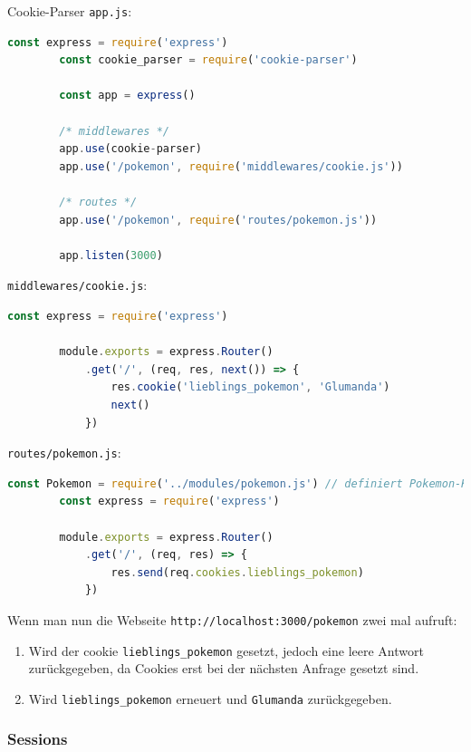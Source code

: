 \begin{example}{Cookie-Parser}
    \texttt{app.js}:
    \begin{lstlisting}[language=JavaScript]
        const express = require('express')
        const cookie_parser = require('cookie-parser')

        const app = express()

        /* middlewares */
        app.use(cookie-parser)
        app.use('/pokemon', require('middlewares/cookie.js'))
        
        /* routes */
        app.use('/pokemon', require('routes/pokemon.js'))

        app.listen(3000)
    \end{lstlisting}

    \texttt{middlewares/cookie.js}:
    \begin{lstlisting}[language=JavaScript]
        const express = require('express')
        
        module.exports = express.Router()
            .get('/', (req, res, next()) => {
                res.cookie('lieblings_pokemon', 'Glumanda')
                next()
            })
    \end{lstlisting}

    \texttt{routes/pokemon.js}:
    \begin{lstlisting}[language=JavaScript]
        const Pokemon = require('../modules/pokemon.js') // definiert Pokemon-Klasse
        const express = require('express')
        
        module.exports = express.Router()
            .get('/', (req, res) => {
                res.send(req.cookies.lieblings_pokemon)
            })
    \end{lstlisting}

    Wenn man nun die Webseite \texttt{http://localhost:3000/pokemon} zwei mal aufruft:
    \begin{enumerate}
        \item Wird der cookie \texttt{lieblings\_pokemon} gesetzt, jedoch eine leere Antwort zurückgegeben, da Cookies erst bei der nächsten Anfrage gesetzt sind.
        \item Wird \texttt{lieblings\_pokemon} erneuert und \texttt{Glumanda} zurückgegeben.
    \end{enumerate}
\end{example}

\subsubsection{Sessions}


